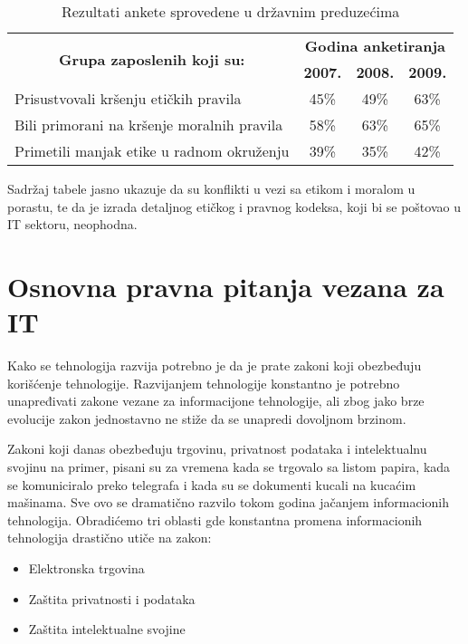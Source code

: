 \documentclass[a4paper]{article}
\begin{document}
{\begin{table}[h!]
\begin{adjustbox}{width=\textwidth}
\begin{tabular}{|l|l|c|c|c|}
\hline
\multicolumn{2}{|c|}{\multirow{2}{*}{\textbf{Grupa zaposlenih koji su:}}}         & \multicolumn{3}{c|}{\textbf{Godina anketiranja}} \\ \cline{3-5} 
\multicolumn{2}{|c|}{}  & \textbf{2007.}    & \textbf{2008.}   & \textbf{2009.}   \\ \hline
\multicolumn{2}{|l|}{\small{Prisustvovali kršenju etičkih pravila}}      & 45\%  & 49\% & 63\%  \\ \hline
\multicolumn{2}{|l|}{\small{Bili primorani na kršenje moralnih pravila}} & 58\%  & 63\% & 65\%  \\ \hline
\multicolumn{2}{|l|}{\small{Primetili manjak etike u radnom okruženju}}  & 39\%  & 35\% & 42\%  \\ \hline
\end{tabular} 
\end{adjustbox} 
\caption{Rezultati ankete sprovedene u državnim preduzećima}
\label{tabela}
\end{table} 

Sadržaj tabele jasno ukazuje da su konflikti u vezi sa etikom i moralom u porastu, te da je izrada detaljnog etičkog i pravnog kodeksa, koji bi se poštovao u IT sektoru, neophodna.

\section{Osnovna pravna pitanja vezana za IT}

Kako se tehnologija razvija potrebno je da je prate zakoni koji obez\-be\-đu\-ju korišćenje tehnologije. Razvijanjem tehnologije konstantno je potrebno unapređivati zakone vezane za informacijone tehnologije, ali zbog jako brze evolucije zakon jednostavno ne stiže da se unapredi dovoljnom brzinom.

Zakoni koji danas obezbeđuju trgovinu, privatnost podataka i intelektualnu svojinu na primer, pisani su za vremena kada se trgovalo sa listom papira, kada se komuniciralo preko telegrafa i kada su se dokumenti kucali na kucaćim mašinama.\cite{Legal_issues} Sve ovo se dramatično razvilo tokom godina jačanjem informacionih tehnologija.
Obradićemo tri oblasti gde konstantna promena informacionih tehnologija drastično utiče na zakon:

\begin{itemize}
\item{Elektronska trgovina}
\item{Zaštita privatnosti i podataka}
\item{Zaštita intelektualne svojine}
\end{itemize}

}
\end{document}
